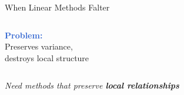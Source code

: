 \documentclass{beamer}
\begin{document}
\begin{frame}{When Linear Methods Falter}
\begin{columns}[T]
\begin{column}{0.48\textwidth}
\begin{center}
\end{center}

\small
\textcolor{highlight}{\textbf{Problem:}}\\
\footnotesize Preserves variance,\\
\footnotesize destroys local structure
\end{column}
\end{columns}

\vspace{0.2cm}
\begin{center}
\colorbox{highlight!20}{
\begin{minipage}{0.85\textwidth}
\centering
\small\textit{Need methods that preserve \textbf{local relationships}}
\end{minipage}
}
\end{center}
\end{frame}
\end{document}
